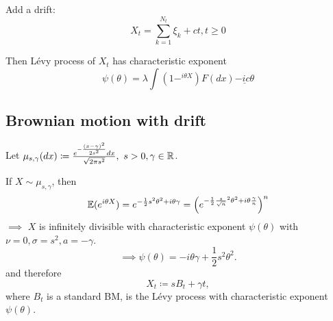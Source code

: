 Add a drift: 
\[X_t=\sum_{k=1}^{N_t}\xi_k+ct,t\geq 0\]

Then Lévy process of $X_t$ has characteristic exponent 
\[\psi(\theta)=\lambda\int (1-^{i\theta X})F(dx)\underline{-ic\theta}\]

\subsection{Brownian motion with drift}

Let $\mu_{s,\gamma}(dx)\coloneqq \frac{e^{-\frac{(x-\gamma)^2}{2s^2}}dx}{\sqrt{2\pi s^2}}, \text{ } s>0,\gamma\in\mathbb{R}$.

If $X\sim \mu_{s,\gamma}$, then 
\[\mathbb{E}(e^{i\theta X})=e^{-\frac{1}{2}s^2\theta^2+i\theta \gamma}=\left(e^{-\frac{1}{2}\frac{s}{\sqrt{n}}^2\theta^2+i\theta \frac{\gamma}{n}}\right)^n\]
$\implies$ $X$ is infinitely divisible with characteristic exponent $\psi(\theta)$ with 
$\nu=0,\sigma=s^2,a=-\gamma$.
\[\implies \psi(\theta)=-i\theta\gamma +\frac{1}{2}s^2\theta^2.\]
and therefore \[X_t\coloneqq s B_t+\gamma t,\]
where $B_t$ is a standard BM, is the Lévy process with characteristic exponent $\psi(\theta)$.


